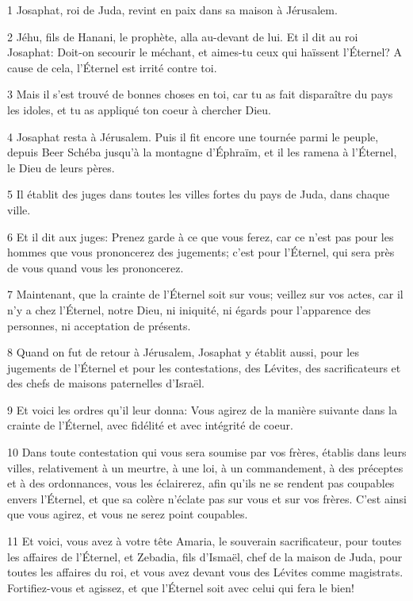 \par 1 Josaphat, roi de Juda, revint en paix dans sa maison à Jérusalem.
\par 2 Jéhu, fils de Hanani, le prophète, alla au-devant de lui. Et il dit au roi Josaphat: Doit-on secourir le méchant, et aimes-tu ceux qui haïssent l'Éternel? A cause de cela, l'Éternel est irrité contre toi.
\par 3 Mais il s'est trouvé de bonnes choses en toi, car tu as fait disparaître du pays les idoles, et tu as appliqué ton coeur à chercher Dieu.
\par 4 Josaphat resta à Jérusalem. Puis il fit encore une tournée parmi le peuple, depuis Beer Schéba jusqu'à la montagne d'Éphraïm, et il les ramena à l'Éternel, le Dieu de leurs pères.
\par 5 Il établit des juges dans toutes les villes fortes du pays de Juda, dans chaque ville.
\par 6 Et il dit aux juges: Prenez garde à ce que vous ferez, car ce n'est pas pour les hommes que vous prononcerez des jugements; c'est pour l'Éternel, qui sera près de vous quand vous les prononcerez.
\par 7 Maintenant, que la crainte de l'Éternel soit sur vous; veillez sur vos actes, car il n'y a chez l'Éternel, notre Dieu, ni iniquité, ni égards pour l'apparence des personnes, ni acceptation de présents.
\par 8 Quand on fut de retour à Jérusalem, Josaphat y établit aussi, pour les jugements de l'Éternel et pour les contestations, des Lévites, des sacrificateurs et des chefs de maisons paternelles d'Israël.
\par 9 Et voici les ordres qu'il leur donna: Vous agirez de la manière suivante dans la crainte de l'Éternel, avec fidélité et avec intégrité de coeur.
\par 10 Dans toute contestation qui vous sera soumise par vos frères, établis dans leurs villes, relativement à un meurtre, à une loi, à un commandement, à des préceptes et à des ordonnances, vous les éclairerez, afin qu'ils ne se rendent pas coupables envers l'Éternel, et que sa colère n'éclate pas sur vous et sur vos frères. C'est ainsi que vous agirez, et vous ne serez point coupables.
\par 11 Et voici, vous avez à votre tête Amaria, le souverain sacrificateur, pour toutes les affaires de l'Éternel, et Zebadia, fils d'Ismaël, chef de la maison de Juda, pour toutes les affaires du roi, et vous avez devant vous des Lévites comme magistrats. Fortifiez-vous et agissez, et que l'Éternel soit avec celui qui fera le bien!

